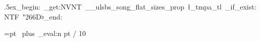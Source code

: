 \DeclareDocumentCommand \shrp {}{\ulSharpSymbol}

\DeclareDocumentCommand \ulFlatSymbol {}
  {\leavevmode\raise.5ex\hbox{\group_begin:
    \prop_get:NVNT \g__ulsbs_song_flat_sizes_prop \f@size \l_tmpa_tl
      {\fontsize{\l_tmpa_tl}{\f@baselineskip}\selectfont}
    \cs_if_exist:NTF \ulSymbolFont
      {{\ulSymbolFont\char"266D}}{\ensuremath{\flat}}\group_end:}}

\DeclareDocumentCommand \flt {}{\ulFlatSymbol}
\setbox\@tempboxa\hbox{{}}
\baselineskip=\f@size pt\relax
\advance\baselineskip 0pt~plus~\dim_eval:n {\f@size pt / 10}\relax
\ExplSyntaxOff
